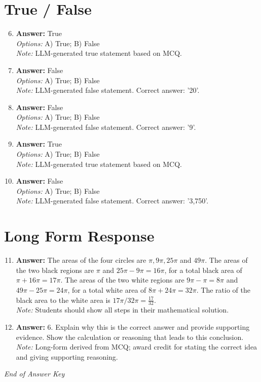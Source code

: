\documentclass[12pt]{article}
\begin{document}
\section*{True / False}
\begin{enumerate}[label=\arabic*.]
\setcounter{enumi}{5}
\item \textbf{Answer:} True
\\ \textit{Options:} A) True; B) False
\\ \textit{Note:} LLM-generated true statement based on MCQ.
\item \textbf{Answer:} False
\\ \textit{Options:} A) True; B) False
\\ \textit{Note:} LLM-generated false statement. Correct answer: '20'.
\item \textbf{Answer:} False
\\ \textit{Options:} A) True; B) False
\\ \textit{Note:} LLM-generated false statement. Correct answer: '9'.
\item \textbf{Answer:} True
\\ \textit{Options:} A) True; B) False
\\ \textit{Note:} LLM-generated true statement based on MCQ.
\item \textbf{Answer:} False
\\ \textit{Options:} A) True; B) False
\\ \textit{Note:} LLM-generated false statement. Correct answer: '3,750'.
\end{enumerate}

\section*{Long Form Response}
\begin{enumerate}[label=\arabic*.]
\setcounter{enumi}{10}
\item \textbf{Answer:} The areas of the four circles are $\pi, 9\pi, 25\pi$ and $49\pi$. The areas of the two black regions are $\pi$ and $25\pi - 9\pi = 16\pi$, for a total black area of $\pi + 16\pi = 17\pi$. The areas of the two white regions are $9\pi - \pi = 8\pi$ and $49\pi - 25\pi = 24\pi$, for a total white area of $8\pi + 24\pi = 32\pi$. The ratio of the black area to the white area is $17\pi/32\pi = \boxed{\frac{17}{32}}.$
\\ \textit{Note:} Students should show all steps in their mathematical solution.
\item \textbf{Answer:} 6. Explain why this is the correct answer and provide supporting evidence. Show the calculation or reasoning that leads to this conclusion.
\\ \textit{Note:} Long-form derived from MCQ; award credit for stating the correct idea and giving supporting reasoning.
\end{enumerate}

\vfill
\noindent\textit{End of Answer Key}
\end{document}
